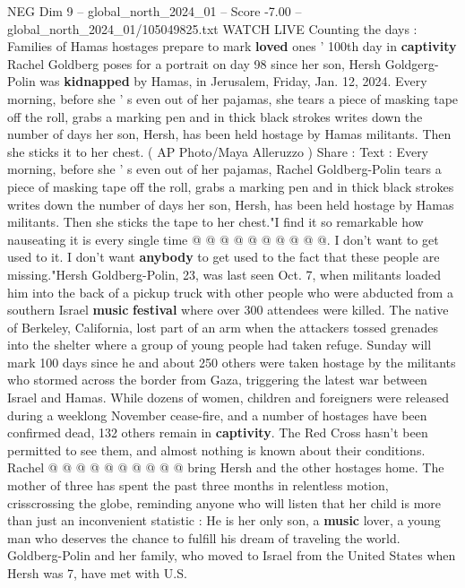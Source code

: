 \begin{textsample}{NEG Dim 9 – global\_north\_2024\_01 – Score -7.00 – global\_north\_2024\_01/105049825.txt}  \label{ex:f9_neg_198}
WATCH LIVE Counting the days : Families of Hamas hostages prepare to mark \textbf{loved} ones ' 100th day in \textbf{captivity} Rachel Goldberg poses for a portrait on day 98 since her son, Hersh Goldgerg-Polin was \textbf{kidnapped} by Hamas, in Jerusalem, Friday, Jan. 12, 2024.
Every morning, before she ' s even out of her pajamas, she tears a piece of masking tape off the roll, grabs a marking pen and in thick black strokes writes down the number of days her son, Hersh, has been held hostage by Hamas militants.
Then she sticks it to her chest. ( AP Photo/Maya Alleruzzo ) Share : Text : Every morning, before she ' s even out of her pajamas, Rachel Goldberg-Polin tears a piece of masking tape off the roll, grabs a marking pen and in thick black strokes writes down the number of days her son, Hersh, has been held hostage by Hamas militants.
Then she sticks the tape to her chest."I find it so remarkable how nauseating it is every single time @ @ @ @ @ @ @ @ @ @.
I don't want to get used to it.
I don't want \textbf{anybody} to get used to the fact that these people are missing."Hersh Goldberg-Polin, 23, was last seen Oct. 7, when militants loaded him into the back of a pickup truck with other people who were abducted from a southern Israel \textbf{music} \textbf{festival} where over 300 attendees were killed.
The native of Berkeley, California, lost part of an arm when the attackers tossed grenades into the shelter where a group of young people had taken refuge.
Sunday will mark 100 days since he and about 250 others were taken hostage by the militants who stormed across the border from Gaza, triggering the latest war between Israel and Hamas.
While dozens of women, children and foreigners were released during a weeklong November cease-fire, and a number of hostages have been confirmed dead, 132 others remain in \textbf{captivity}.
The Red Cross hasn't been permitted to see them, and almost nothing is known about their conditions.
Rachel @ @ @ @ @ @ @ @ @ @ bring Hersh and the other hostages home.
The mother of three has spent the past three months in relentless motion, crisscrossing the globe, reminding anyone who will listen that her child is more than just an inconvenient statistic : He is her only son, a \textbf{music} lover, a young man who deserves the chance to fulfill his dream of traveling the world.
Goldberg-Polin and her family, who moved to Israel from the United States when Hersh was 7, have met with U.S.

\end{textsample}
